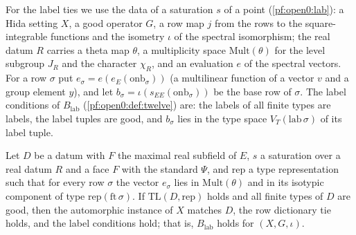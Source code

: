 For the label ties we use the data of a saturation $s$ of a point (\cref{pf:open0:lab}): a Hida setting $X$, a good operator $G$, a row
map $j$ from the rows to the square-integrable functions and the isometry $\iota$ of the spectral isomorphism; the real datum $R$
carries a theta map $\theta$, a multiplicity space $\mathrm{Mult}(\theta)$ for the level subgroup $J_R$ and the character $\chi_R$,
and an evaluation $e$ of the spectral vectors. For a row $\sigma$ put $e_\sigma=e(e_E(\mathrm{onb}_\sigma))$ (a multilinear function of
a vector $v$ and a group element $y$), and let $b_\sigma=\iota(s_{EE}(\mathrm{onb}_\sigma))$ be the base row of $\sigma$. The label
conditions of $B_{\mathrm{lab}}$ (\cref{pf:open0:def:twelve}) are: the labels of all finite types are labels, the label tuples are
good, and $b_\sigma$ lies in the type space $V_T(\mathrm{lab}\,\sigma)$ of its label tuple.

\begin{theorem}\label{pf:open0:irred}
Let $D$ be a datum with $F$ the maximal real subfield of $E$, $s$ a saturation over a real datum $R$ and a face $F$ with the standard
$\Psi$, and $\mathrm{rep}$ a type representation such that for every row $\sigma$ the vector $e_\sigma$ lies in $\mathrm{Mult}(\theta)$
and in its isotypic component of type $\mathrm{rep}(\mathrm{ft}\,\sigma)$. If $\mathrm{TL}(D,\mathrm{rep})$ holds and all finite types of $D$
are good, then the automorphic instance of $X$ matches $D$, the row dictionary tie holds, and the label conditions hold; that is,
$B_{\mathrm{lab}}$ holds for $(X,G,\iota)$.
\ \
\ \
\ 
\end{theorem}

